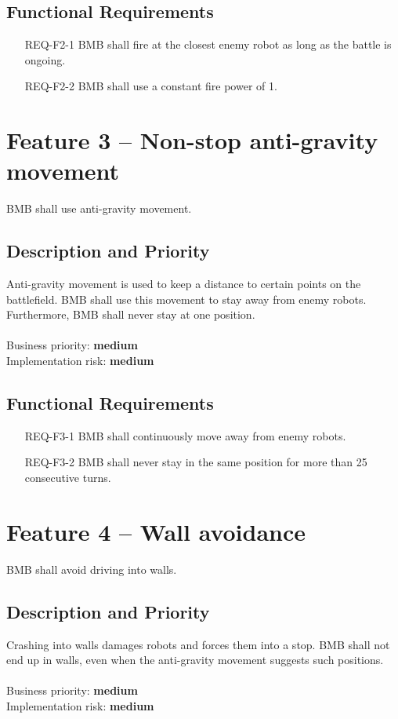 \documentclass{scrreprt}
\begin{document}
\subsection{Functional Requirements}
\begin{itemize}
\item[REQ-F2-1] BMB shall fire at the closest enemy robot as long as the battle is ongoing.
\item[REQ-F2-2] BMB shall use a constant fire power of 1.
\end{itemize}

\section{Feature 3 -- Non-stop anti-gravity movement}
BMB shall use anti-gravity movement.
	
\subsection{Description and Priority}
Anti-gravity movement is used to keep a distance to certain points on the battlefield. BMB shall use this movement to stay away from enemy robots. Furthermore, BMB shall never stay at one position.\\\\Business priority: \textbf{medium}\\
Implementation risk: \textbf{medium}

\subsection{Functional Requirements}
\begin{itemize}
\item[REQ-F3-1] BMB shall continuously move away from enemy robots.
\item[REQ-F3-2] BMB shall never stay in the same position for more than 25 consecutive turns.
\end{itemize}

\section{Feature 4 -- Wall avoidance}
BMB shall avoid driving into walls.

\subsection{Description and Priority}
Crashing into walls damages robots and forces them into a stop. BMB shall not end up in walls, even when the anti-gravity movement suggests such positions.\\\\Business priority: \textbf{medium}\\
Implementation risk: \textbf{medium}
\end{document}
